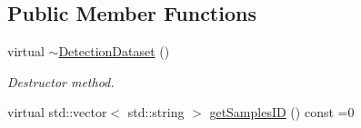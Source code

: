 \subsection*{Public Member Functions}
\begin{DoxyCompactItemize}
\item 
\hypertarget{class_vision_core_1_1_evaluation_1_1_detection_dataset_a74f581b470028b781e9f4d6c2e0f56b0}{}virtual \hyperlink{class_vision_core_1_1_evaluation_1_1_detection_dataset_a74f581b470028b781e9f4d6c2e0f56b0}{$\sim$\+Detection\+Dataset} ()\label{class_vision_core_1_1_evaluation_1_1_detection_dataset_a74f581b470028b781e9f4d6c2e0f56b0}

\begin{DoxyCompactList}\small\item\em Destructor method. \end{DoxyCompactList}\item 
\hypertarget{class_vision_core_1_1_evaluation_1_1_detection_dataset_a4baafaba65ce3ae8e9fc8a5f74f5e0f8}{}virtual std\+::vector$<$ std\+::string $>$ \hyperlink{class_vision_core_1_1_evaluation_1_1_detection_dataset_a4baafaba65ce3ae8e9fc8a5f74f5e0f8}{get\+Samples\+I\+D} () const  =0\label{class_vision_core_1_1_evaluation_1_1_detection_dataset_a4baafaba65ce3ae8e9fc8a5f74f5e0f8}


\end{DoxyCompactItemize}
